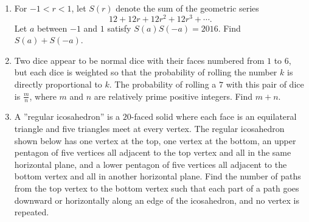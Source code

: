 \documentclass{article}
\begin{document}
\begin{enumerate}[label=\arabic*., itemsep=0.5em]
\item For \(-1<r<1\), let \(S(r)\) denote the sum of the geometric series 
\begin{equation*}
12+12r+12r^2+12r^3+\cdots .
\end{equation*}
  Let \(a\) between \(-1\) and \(1\) satisfy \(S(a)S(-a)=2016\). Find \(S(a)+S(-a)\).\par \vspace{0.5em}\item Two dice appear to be normal dice with their faces numbered from \(1\) to \(6\), but each dice is weighted so that the probability of rolling the number \(k\) is directly proportional to \(k\). The probability of rolling a \(7\) with this pair of dice is \(\frac{m}{n}\), where \(m\) and \(n\) are relatively prime positive integers. Find \(m+n\).\par \vspace{0.5em}\item A ''regular icosahedron'' is a \(20\)-faced solid where each face is an equilateral triangle and five triangles meet at every vertex. The regular icosahedron shown below has one vertex at the top, one vertex at the bottom, an upper pentagon of five vertices all adjacent to the top vertex and all in the same horizontal plane, and a lower pentagon of five vertices all adjacent to the bottom vertex and all in another horizontal plane. Find the number of paths from the top vertex to the bottom vertex such that each part of a path goes downward or horizontally along an edge of the icosahedron, and no vertex is repeated.


\end{enumerate}
\end{document}
